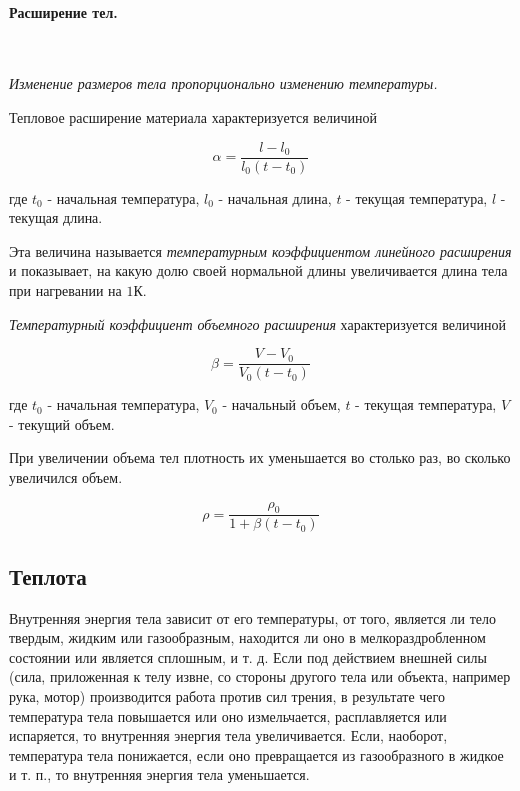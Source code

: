 \documentclass[a4paper,12pt]{article}
\begin{document}
		\paragraph*{Расширение тел.} \

		\textit{Изменение размеров тела пропорционально изменению температуры.}

		Тепловое расширение материала характеризуется величиной

		\begin{equation}
			\alpha = \frac{l-l_0}{l_0(t-t_0)}
		\end{equation}

		где $t_0$ - начальная температура, $l_0$ - начальная длина, $t$ - текущая температура,
		$l$ - текущая длина.

		Эта величина называется \textit{температурным коэффициентом линейного расширения} и 
		показывает, на какую долю своей нормальной длины увеличивается длина тела при 
		нагревании на $1\text{К}$.

		\textit{Температурный коэффициент объемного расширения} характеризуется величиной

		\begin{equation}
			\beta = \frac{V-V_0}{V_0(t-t_0)}
		\end{equation}

		где $t_0$ - начальная температура, $V_0$ - начальный объем, $t$ - текущая температура,
		$V$ - текущий объем.

		При увеличении объема тел плотность их уменьшается во столько раз, во сколько
		увеличился объем.
		
		\begin{equation}
			\rho = \frac{\rho_0}{1+\beta(t-t_0)}
		\end{equation}


		\subsection*{Теплота}

		Внутренняя энергия тела зависит от его температуры, от того, является ли тело твердым, 
		жидким или газообразным, находится ли оно в мелкораздробленном состоянии или является сплошным, 
		и т. д. Если под действием внешней силы (сила, приложенная к телу извне, со стороны другого 
		тела или объекта, например рука, мотор) производится работа против сил трения, в результате чего 
		температура тела повышается или оно измельчается, расплавляется или испаряется, то внутренняя 
		энергия тела увеличивается. Если, наоборот, температура тела понижается, если оно превращается 
		из газообразного в жидкое и т. п., то внутренняя энергия тела уменьшается.
\end{document}
